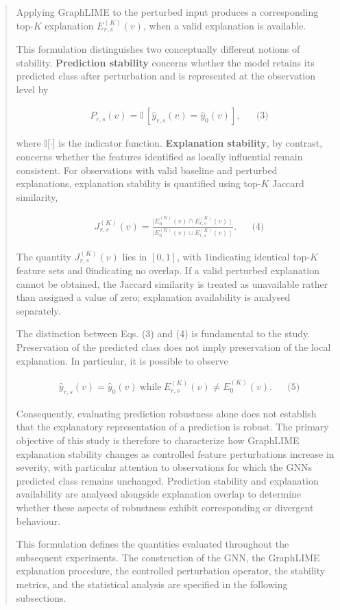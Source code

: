\documentclass[a4paper]{article}
\begin{document}
\begin{quote}
Applying GraphLIME to the perturbed input produces a corresponding
top-\(K\) explanation \(E_{r,s}^{(K)}(v)\), when a valid explanation is
available.

This formulation distinguishes two conceptually different notions of
stability. \textbf{Prediction stability} concerns whether the model
retains its predicted class after perturbation and is represented at the
observation level by

\[\begin{matrix}
 & P_{r,s}(v)\mathbb{= I}\text{ }\left\lbrack {\widehat{y}}_{r,s}(v) = {\widehat{y}}_{0}(v) \right\rbrack, & & \text{(3)}
\end{matrix}
\]

where \(\mathbb{I}\lbrack \cdot \rbrack\) is the indicator function.
\textbf{Explanation stability}, by contrast, concerns whether the
features identified as locally influential remain consistent. For
observations with valid baseline and perturbed explanations, explanation
stability is quantified using top-\(K\) Jaccard similarity,

\[\begin{matrix}
 & J_{r,s}^{(K)}(v) = \frac{\left. \mid E_{0}^{(K)}(v) \cap E_{r,s}^{(K)}(v) \right.\mid}{\left. \mid E_{0}^{(K)}(v) \cup E_{r,s}^{(K)}(v) \right.\mid}. & & \text{(4)}
\end{matrix}
\]

The quantity \(J_{r,s}^{(K)}(v)\) lies in
\(\left\lbrack 0,1 \right\rbrack\), with \(1\)indicating identical
top-\(K\) feature sets and \(0\)indicating no overlap. If a valid
perturbed explanation cannot be obtained, the Jaccard similarity is
treated as unavailable rather than assigned a value of zero; explanation
availability is analysed separately.

The distinction between Eqs. (3) and (4) is fundamental to the study.
Preservation of the predicted class does not imply preservation of the
local explanation. In particular, it is possible to observe

\[\begin{matrix}
 & {\widehat{y}}_{r,s}(v) = {\widehat{y}}_{0}(v)\ \text{while}\ E_{r,s}^{(K)}(v) \neq E_{0}^{(K)}(v). & & \text{(5)}
\end{matrix}
\]

Consequently, evaluating prediction robustness alone does not establish
that the explanatory representation of a prediction is robust. The
primary objective of this study is therefore to characterize how
GraphLIME explanation stability changes as controlled feature
perturbations increase in severity, with particular attention to
observations for which the GNN\textquotesingle s predicted class remains
unchanged. Prediction stability and explanation availability are
analysed alongside explanation overlap to determine whether these
aspects of robustness exhibit corresponding or divergent behaviour.

This formulation defines the quantities evaluated throughout the
subsequent experiments. The construction of the GNN, the GraphLIME
explanation procedure, the controlled perturbation operator, the
stability metrics, and the statistical analysis are specified in the
following subsections.
\end{quote}
\end{document}
